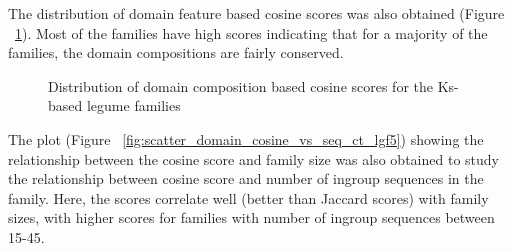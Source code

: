 \documentclass{article}
\begin{document}
		The distribution of domain feature based cosine scores was also obtained (Figure ~\ref{fig:hist_domain_cosine_scores_lgf5}). Most of the families have high scores indicating that for a majority of the families, the domain compositions are fairly conserved. 
		
		\begin{figure}
			\caption{Distribution of domain composition based cosine scores for the Ks-based legume families}
			\label{fig:hist_domain_cosine_scores_lgf5}
		\end{figure}
		
		The plot (Figure ~\ref{fig:scatter_domain_cosine_vs_seq_ct_lgf5}) showing the relationship between the cosine score and family size was also obtained to study the relationship between cosine score and number of ingroup sequences in the family. Here, the scores correlate well (better than Jaccard scores) with family sizes, with higher scores for families with number of ingroup sequences between 15-45.
		
\end{document}
